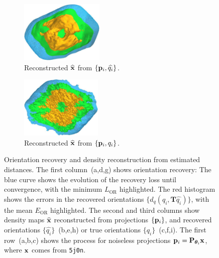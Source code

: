 \begin{figure}[t]
    \hfill
    \begin{subfigure}[b]{0.26\linewidth}
        \centering
        \includegraphics[height=8em]{figures/5a1a_aligned}
        \caption{Reconstructed $\widehat{\mathbf{x}}$ from $\{ \mathbf{p}_i, \widehat{q_i} \}$.}%
        \label{fig:5a1a-noise0-reconstruction-recovered}
    \end{subfigure}
    \hfill
    \begin{subfigure}[b]{0.26\linewidth}
        \centering
        \includegraphics[height=8em]{figures/5a1a_ground_truth}
        \caption{Reconstructed $\widehat{\mathbf{x}}$ from $\{ \mathbf{p}_i, q_i \}$.}%
        \label{fig:5a1a-noise0-reconstruction-true}
    \end{subfigure}
    \caption{%
        Orientation recovery and density reconstruction from estimated distances.
        The first column~(a,d,g) shows orientation recovery:
        The blue curve shows the evolution of the recovery loss until convergence, with the minimum $L_\text{OR}$  highlighted.
        The red histogram shows the errors in the recovered orientations $\{d_q(q_i, \mathbf{T}\widehat{q_i})\}$, with the mean $E_\text{OR}$  highlighted.
    The second and third columns show density maps $\widehat{\mathbf{x}}$ reconstructed from projections $\{ \mathbf{p}_i \}$, and recovered orientations $\{ \widehat{q_i} \}$~(b,e,h) or true orientations $\{ q_i \}$~(c,f,i).
        The first row~(a,b,c) shows the process for noiseless projections $\mathbf{p}_i = \mathbf{P}_{{\boldsymbol{\theta}}_i} \mathbf{x}$, where $\mathbf{x}$ comes from \texttt{5j0n}.
}
\end{figure}
